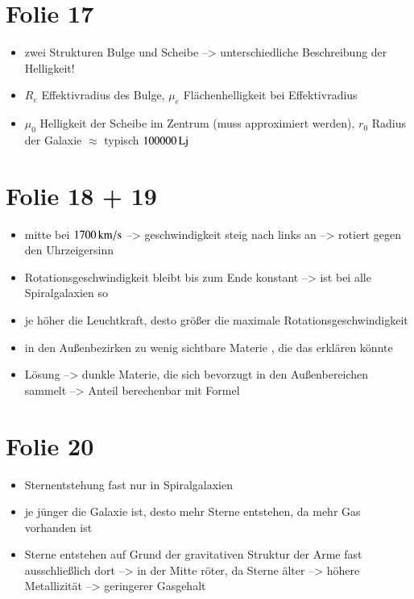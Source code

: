 \section{Folie 17}

\begin{itemize}
\item zwei Strukturen Bulge und Scheibe --> unterschiedliche Beschreibung der Helligkeit!
\item $R_e$ Effektivradius des Bulge, $\mu_e$ Flächenhelligkeit bei Effektivradius
\item $\mu_0$ Helligkeit der Scheibe im Zentrum (muss approximiert werden), $r_0$ Radius der Galaxie $\approx$ typisch $\unit[100000]{Lj}$
\end{itemize}


\newpage

\section{Folie 18 + 19}

\begin{itemize}
\item mitte bei $\unit[1700]{km/s}$ --> geschwindigkeit steig nach links an --> rotiert gegen den Uhrzeigersinn
\item Rotationsgeschwindigkeit bleibt bis zum Ende konstant --> ist bei alle Spiralgalaxien so
\item je höher die Leuchtkraft, desto größer die maximale Rotationsgeschwindigkeit
\item in den Außenbezirken zu wenig sichtbare Materie , die das erklären könnte
\item Lösung --> dunkle Materie, die sich bevorzugt in den Außenbereichen sammelt --> Anteil berechenbar mit Formel
\end{itemize}


\section{Folie 20}

\begin{itemize}
\item Sternentstehung fast nur in Spiralgalaxien
\item je jünger die Galaxie ist, desto mehr Sterne entstehen, da mehr Gas vorhanden ist
\item Sterne entstehen auf Grund der gravitativen Struktur der Arme fast ausschließlich dort --> in der Mitte röter, da Sterne älter --> höhere Metallizität --> geringerer Gasgehalt
\end{itemize}


